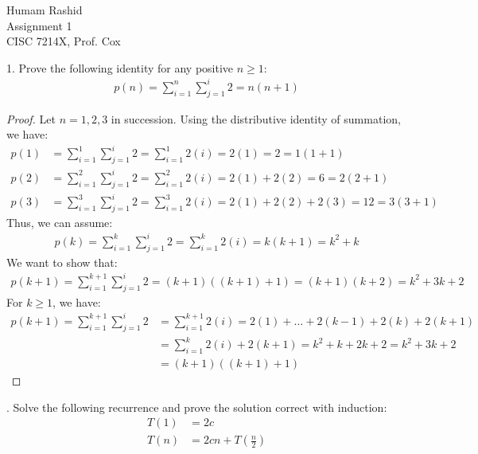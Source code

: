 \documentclass{scrartcl}
\begin{document}
\begin{flushleft}

    Humam Rashid\\
    Assignment 1\\
    CISC 7214X, Prof. Cox\\
    \bigskip
    
    1. Prove the following identity for any positive $n \geq 1$:
    \begin{align*}
        p(n) = \sum_{i=1}^{n}\sum_{j=1}^{i} 2 = n (n + 1)
    \end{align*}
    \begin{proof}
        Let $n = 1,2,3$ in succession. Using the distributive identity of summation, we have:
        \begin{align*}
            p(1) &= \sum_{i=1}^{1}\sum_{j=1}^{i} 2 = \sum_{i=1}^{1} 2(i) = 2(1) = 2 = 1(1 + 1)\\
            p(2) &= \sum_{i=1}^{2}\sum_{j=1}^{i} 2 = \sum_{i=1}^{2} 2(i) = 2(1) + 2(2) = 6
            = 2(2 + 1)\\
            p(3) &= \sum_{i=1}^{3}\sum_{j=1}^{i} 2 = \sum_{i=1}^{3} 2(i) = 2(1) + 2(2) + 2(3) = 12
            = 3(3 + 1)
        \end{align*}
        Thus, we can assume:
        \begin{align*}
            p(k) = \sum_{i=1}^{k}\sum_{j=1}^{i} 2 = \sum_{i=1}^{k} 2(i) = k(k + 1) = k^2 + k
        \end{align*}
        We want to show that:
        \begin{align*}
            p(k + 1) = \sum_{i=1}^{k + 1}\sum_{j=1}^{i} 2 = (k + 1) ((k + 1) + 1) = (k + 1) (k + 2) = k^2 + 3k + 2
        \end{align*}
        For $k \geq 1$, we have:
        \begin{align*}
            p(k + 1) = \sum_{i=1}^{k + 1}\sum_{j=1}^{i} 2 &= \sum_{i=1}^{k+1} 2(i) = 2(1) + \ldots
            + 2(k - 1) + 2(k) + 2(k + 1) \\
            &= \sum_{i=1}^{k} 2(i) + 2(k + 1) = k^2 + k + 2k + 2 = k^2 + 3k + 2 \\
            &= (k + 1) ((k + 1) + 1)
        \end{align*}
    \end{proof}
    . Solve the following recurrence and prove the solution correct with induction:
    \begin{align*}
        T(1) &= 2c\\
        T(n) &= 2cn + T(\frac{n}{2})
    \end{align*}

\end{flushleft}
\end{document}
